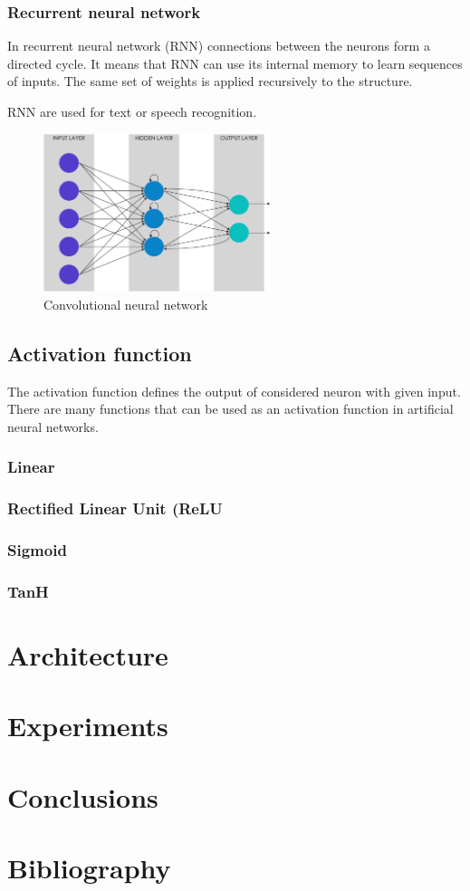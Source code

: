 \documentclass[journal, a4paper]{IEEEtran}
\begin{document}
\subsubsection{Recurrent neural network}
In recurrent neural network (RNN) connections between the neurons form a directed cycle. It means that RNN can use its internal memory to learn  sequences of inputs. The same set of weights is applied recursively to the structure.
\par RNN are used for text or speech recognition.
\begin{figure}[H]
\centering
\includegraphics[width=250px]{pictures/rnn.png}
\caption{Convolutional neural network}
\end{figure}

\subsection{Activation function}
The activation function defines the output of considered neuron with given input. There are many functions that can be used as an activation function in artificial neural networks.
\subsubsection{Linear}
\subsubsection{Rectified Linear Unit (ReLU}
\subsubsection{Sigmoid}
\subsubsection{TanH}

\section{Architecture}
\section{Experiments}
\section{Conclusions}
\section{Bibliography}
\end{document}
